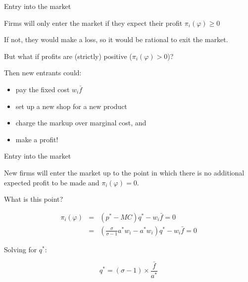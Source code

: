 \documentclass[notes,11pt, aspectratio=169, xcolor=table]{beamer}
\newenvironment{wideitemize}{\itemize\addtolength{\itemsep}{10pt}}{\enditemize}
\begin{document}
\begin{frame}{Entry into the market}

\begin{wideitemize}
    \item Firms will only enter the market if they expect their profit $\pi_i(\varphi) \ge0$
    \item<2-> If not, they would make a loss, so it would be rational to exit the market.
    \item<3-> But what if profits are (strictly) positive ($\pi_i(\varphi) >0$)?

    \item<4-> Then new entrants could:

    \begin{itemize}
        \item<5-> pay the fixed cost $w_i \bar{f}$
        \item<6-> set up a new shop for a new product
        \item<7-> charge the markup over marginal cost, and
        \item<8-> make a profit!
    \end{itemize}
\end{wideitemize}    
\end{frame}

\begin{frame}{Entry into the market}

    \begin{wideitemize}
    \item New firms will enter the market up to the point in which there is no additional expected profit to be made and $\pi_i(\varphi) =0$.

    \item<2-> What is this point?
    
\begin{eqnarray*}
    \pi_i(\varphi) &=& (p^* - MC) q^* - w_i \bar{f} = 0\\
    &=& \left(\frac{\sigma}{\sigma -1}a^*w_i - a^* w_i\right) q^* - w_i \bar{f} =0  
\end{eqnarray*}

    \item<3-> Solving for $q^*$:

    \begin{equation*}
    \boxed{
        q^* = (\sigma-1) \times \frac{\bar{f}}{a^*}
    }
    \end{equation*}

    \end{wideitemize}
    
\end{frame}
\end{document}

